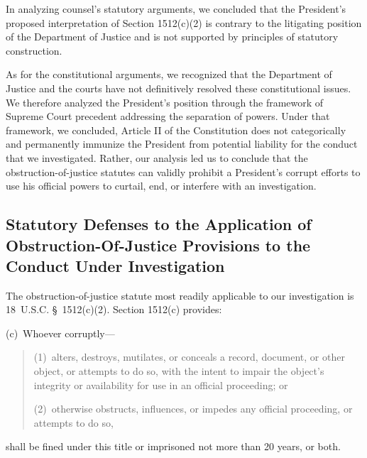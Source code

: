 In analyzing counsel's statutory arguments, we concluded that the President's proposed interpretation of Section 1512(c)(2) is contrary to the litigating position of the Department of Justice and is not supported by principles of statutory construction.

As for the constitutional arguments, we recognized that the Department of Justice and the courts have not definitively resolved these constitutional issues.
We therefore analyzed the President's position through the framework of Supreme Court precedent addressing the separation of powers.
Under that framework, we concluded, Article II of the Constitution does not categorically and permanently immunize the President from potential liability for the conduct that we investigated.
Rather, our analysis led us to conclude that the obstruction-of-justice statutes can validly prohibit a President's corrupt efforts to use his official powers to curtail, end, or interfere with an investigation.

\subsection{Statutory Defenses to the Application of Obstruction-Of-Justice Provisions to the Conduct Under Investigation}

The obstruction-of-justice statute most readily applicable to our investigation is 18~U.S.C. \S~1512(c)(2). Section 1512(c) provides:

(c)~Whoever corruptly---

\begin{quote}
(1)~alters, destroys, mutilates, or conceals a record, document, or other object, or attempts to do so, with the intent to impair the object's integrity or availability for use in an official proceeding; or

(2)~otherwise obstructs, influences, or impedes any official proceeding, or attempts to do so,
\end{quote}

shall be fined under this title or imprisoned not more than 20 years, or both.

